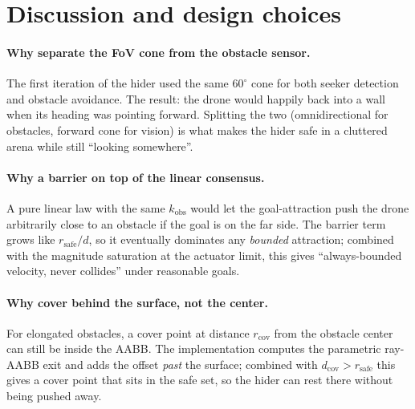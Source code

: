 \documentclass[11pt,a4paper]{article}
\begin{document}
\section{Discussion and design choices}

\paragraph{Why separate the FoV cone from the obstacle sensor.}
The first iteration of the hider used the same $60^\circ$ cone for both
seeker detection and obstacle avoidance. The result: the drone would happily
back into a wall when its heading was pointing forward. Splitting the two
(omnidirectional for obstacles, forward cone for vision) is what makes the
hider safe in a cluttered arena while still ``looking somewhere''.

\paragraph{Why a barrier on top of the linear consensus.}
A pure linear law with the same $k_\mathrm{obs}$ would let the goal-attraction
push the drone arbitrarily close to an obstacle if the goal is on the far
side. The barrier term grows like $r_\mathrm{safe}/d$, so it eventually
dominates any \emph{bounded} attraction; combined with the magnitude
saturation at the actuator limit, this gives ``always-bounded velocity, never
collides'' under reasonable goals.

\paragraph{Why cover behind the surface, not the center.}
For elongated obstacles, a cover point at distance $r_\mathrm{cov}$ from the
obstacle center can still be inside the AABB. The implementation computes the
parametric ray-AABB exit and adds the offset \emph{past} the surface; combined
with $d_\mathrm{cov} > r_\mathrm{safe}$ this gives a cover point that sits in
the safe set, so the hider can rest there without being pushed away.
\end{document}
